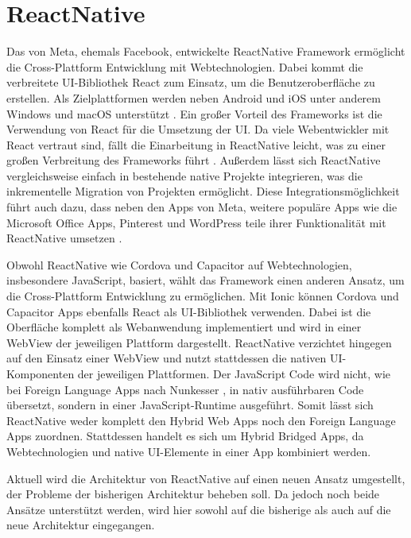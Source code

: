 \section{ReactNative}
\label{sec:Frameorks_ReactNative}

Das von Meta, ehemals Facebook, entwickelte ReactNative Framework ermöglicht die Cross-Plattform Entwicklung mit Webtechnologien.
Dabei kommt die verbreitete \ac{UI}-Bibliothek React zum Einsatz, um die Benutzeroberfläche zu erstellen.
Als Zielplattformen werden neben Android und iOS unter anderem Windows und macOS unterstützt \cite{ReactNative}.
Ein großer Vorteil des Frameworks ist die Verwendung von React für die Umsetzung der \ac{UI}.
Da viele Webentwickler mit React vertraut sind, fällt die Einarbeitung in ReactNative leicht, was zu einer großen Verbreitung des Frameworks führt \cite{Appfigures_TopSDKs,Stackoverflow_2022}.
Außerdem lässt sich ReactNative vergleichsweise einfach in bestehende native Projekte integrieren, was die inkrementelle Migration von Projekten ermöglicht.
Diese Integrationsmöglichkeit führt auch dazu, dass neben den Apps von Meta, weitere populäre Apps wie die Microsoft Office Apps, Pinterest und WordPress teile ihrer Funktionalität mit ReactNative umsetzen \cite{ReactNative_Showcase}.


Obwohl ReactNative wie Cordova und Capacitor auf Webtechnologien, insbesondere JavaScript, basiert, wählt das Framework einen anderen Ansatz, um die Cross-Plattform Entwicklung zu ermöglichen.
Mit Ionic können Cordova und Capacitor Apps ebenfalls React als \ac{UI}-Bibliothek verwenden.
Dabei ist die Oberfläche komplett als Webanwendung implementiert und wird in einer WebView der jeweiligen Plattform dargestellt.
ReactNative verzichtet hingegen auf den Einsatz einer WebView und nutzt stattdessen die nativen \ac{UI}-Komponenten der jeweiligen Plattformen.
Der JavaScript Code wird nicht, wie bei Foreign Language Apps nach Nunkesser \cite{Nunkesser_Taxonomy_Apps}, in nativ ausführbaren Code übersetzt, sondern in einer JavaScript-Runtime ausgeführt.
Somit lässt sich ReactNative weder komplett den Hybrid Web Apps noch den Foreign Language Apps zuordnen.
Stattdessen handelt es sich um Hybrid Bridged Apps, da Webtechnologien und native \ac{UI}-Elemente in einer App kombiniert werden.


Aktuell wird die Architektur von ReactNative auf einen neuen Ansatz umgestellt, der Probleme der bisherigen Architektur beheben soll.
Da jedoch noch beide Ansätze unterstützt werden, wird hier sowohl auf die bisherige als auch auf die neue Architektur eingegangen.

